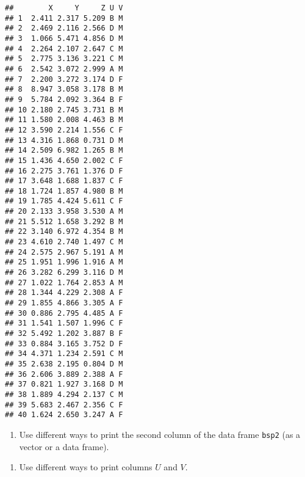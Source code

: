 \documentclass[]{article}
\newenvironment{Shaded}{\begin{snugshade}}{\end{snugshade}}
\newcommand{\DecValTok}[1]{\textcolor[rgb]{0.00,0.00,0.81}{#1}}
\newcommand{\StringTok}[1]{\textcolor[rgb]{0.31,0.60,0.02}{#1}}
\newcommand{\OperatorTok}[1]{\textcolor[rgb]{0.81,0.36,0.00}{\textbf{#1}}}
\newcommand{\NormalTok}[1]{#1}
\providecommand{\tightlist}{%
  \setlength{\itemsep}{0pt}\setlength{\parskip}{0pt}}
\begin{document}
\begin{verbatim}
##        X     Y     Z U V
## 1  2.411 2.317 5.209 B M
## 2  2.469 2.116 2.566 D M
## 3  1.066 5.471 4.856 D M
## 4  2.264 2.107 2.647 C M
## 5  2.775 3.136 3.221 C M
## 6  2.542 3.072 2.999 A M
## 7  2.200 3.272 3.174 D F
## 8  8.947 3.058 3.178 B M
## 9  5.784 2.092 3.364 B F
## 10 2.180 2.745 3.731 B M
## 11 1.580 2.008 4.463 B M
## 12 3.590 2.214 1.556 C F
## 13 4.316 1.868 0.731 D M
## 14 2.509 6.982 1.265 B M
## 15 1.436 4.650 2.002 C F
## 16 2.275 3.761 1.376 D F
## 17 3.648 1.688 1.837 C F
## 18 1.724 1.857 4.980 B M
## 19 1.785 4.424 5.611 C F
## 20 2.133 3.958 3.530 A M
## 21 5.512 1.658 3.292 B M
## 22 3.140 6.972 4.354 B M
## 23 4.610 2.740 1.497 C M
## 24 2.575 2.967 5.191 A M
## 25 1.951 1.996 1.916 A M
## 26 3.282 6.299 3.116 D M
## 27 1.022 1.764 2.853 A M
## 28 1.344 4.229 2.308 A F
## 29 1.855 4.866 3.305 A F
## 30 0.886 2.795 4.485 A F
## 31 1.541 1.507 1.996 C F
## 32 5.492 1.202 3.887 B F
## 33 0.884 3.165 3.752 D F
## 34 4.371 1.234 2.591 C M
## 35 2.638 2.195 0.804 D M
## 36 2.606 3.889 2.388 A F
## 37 0.821 1.927 3.168 D M
## 38 1.889 4.294 2.137 C M
## 39 5.683 2.467 2.356 C F
## 40 1.624 2.650 3.247 A F
\end{verbatim}

\begin{enumerate}
\def\labelenumi{\arabic{enumi}.}
\tightlist
\item
  Use different ways to print the second column of the data frame
  \texttt{bsp2} (as a vector or a data frame).
\end{enumerate}

\begin{Shaded}
\end{Shaded}

\begin{enumerate}
\def\labelenumi{\arabic{enumi}.}
\setcounter{enumi}{1}
\tightlist
\item
  Use different ways to print columns \(U\) and \(V\).
\end{enumerate}

\begin{Shaded}
\end{Shaded}
\end{document}
